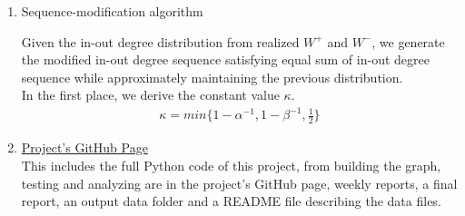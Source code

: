 \documentclass{article}
\begin{document}
\begin{enumerate}
\item \hypertarget{eaual_sum_algo}{Sequence-modification algorithm}
\par Given the in-out degree distribution from realized $W^{+}$ and $W^{-}$, we generate the modified in-out degree sequence satisfying equal sum of in-out degree sequence while approximately maintaining the previous distribution.\\
 In the first place, we derive the constant value $\kappa$. 
\begin{align*}
 \kappa = min\{ 1 - \alpha^{-1}, 1 - \beta^{-1}, \frac{1}{2} \}
 \end{align*}


\item \href{https://github.com/leahwu/DCM_simulaiton_and_analysis}{Project's GitHub Page}\\
This includes the full Python code of this project, from building the graph, testing and analyzing are in the project's GitHub page, weekly reports, a final report, an output data folder and a README file describing the data files.

\end{enumerate}
\end{document}
